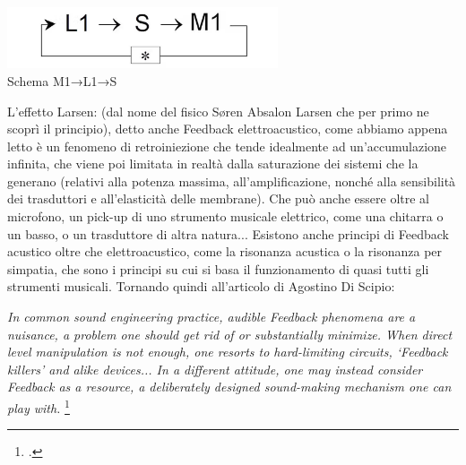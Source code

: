 \begin{center}
\vspace{0.5cm}
\includegraphics[width=8cm]{figures/larsen_Feedback_scheme.png} \\
{Schema M1→L1→S} \\ 
\vspace{0.5cm}
\end{center}

L'effetto Larsen: (dal nome del fisico Søren Absalon Larsen
che per primo ne scoprì il principio), detto anche Feedback elettroacustico,
come abbiamo appena letto è un fenomeno di retroiniezione che tende idealmente 
ad un'accumulazione infinita, che viene poi limitata in realtà dalla saturazione dei sistemi 
che la generano (relativi alla potenza massima, all'amplificazione, nonché alla sensibilità dei
trasduttori e all'elasticità delle membrane). Che può anche essere oltre al microfono, un
pick-up di uno strumento musicale elettrico, come una chitarra o un basso, o un trasduttore di
altra natura... 
Esistono anche principi di Feedback acustico oltre che elettroacustico, 
come la risonanza acustica o la risonanza per simpatia,
che sono i principi su cui si basa il funzionamento di quasi tutti gli strumenti musicali.
Tornando quindi all'articolo di Agostino Di Scipio:

\begin{center}
\vspace{0.5cm}
\textit{In common sound engineering practice, audible Feedback phenomena are a nuisance, a problem one
should get rid of or substantially minimize. When direct level manipulation is not enough, one
resorts to hard-limiting circuits, ‘Feedback killers’ and alike devices... 
In a different attitude, one may instead consider Feedback as
a resource, a deliberately designed sound-making mechanism one can play with.} \footcite{di_scipio_relational_2022}
\vspace{0.5cm}
\end{center}

